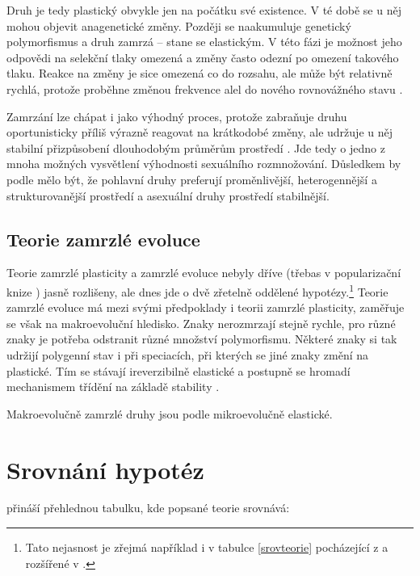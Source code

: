 Druh je tedy plastický obvykle jen na počátku své existence. V té době se u něj mohou objevit anagenetické změny.
Později se naakumuluje genetický polymorfismus a druh zamrzá -- stane se elastickým. V této fázi je možnost jeho
odpovědi na selekční tlaky omezená a změny často odezní po omezení takového tlaku. Reakce na změny je sice omezená
co do rozsahu, ale může být relativně rychlá, protože proběhne změnou frekvence alel do nového rovnovážného stavu
\citep[str. 194]{flegr2016}.

Zamrzání lze chápat i jako výhodný proces, protože zabraňuje druhu oportunisticky příliš výrazně reagovat na
krátkodobé změny, ale udržuje u něj stabilní přizpůsobení dlouhodobým průměrům prostředí \citep[str. 195]{flegr2016}.
Jde tedy o jedno z mnoha možných vysvětlení výhodnosti sexuálního rozmnožování. Důsledkem by podle
\citet[str. 166--167]{toman2015} mělo být, že pohlavní druhy preferují proměnlivější, heterogennější
a strukturovanější prostředí a asexuální druhy prostředí stabilnější.

\subsection{Teorie zamrzlé evoluce}

Teorie zamrzlé plasticity a zamrzlé evoluce nebyly dříve (třebas v popularizační knize \citet{flegr2006})
jasně rozlišeny, ale dnes   jde o dvě zřetelně oddělené hypotézy.\footnote{
Tato nejasnost je zřejmá například i v tabulce \ref{srovteorie} pocházející z \citet{flegr2010} a rozšířené v
\citet{flegr2013}.
}
Teorie zamrzlé evoluce má mezi svými předpoklady i teorii zamrzlé plasticity, zaměřuje se však na makroevoluční
hledisko. Znaky nerozmrzají stejně rychle, pro různé znaky je potřeba odstranit různé množství polymorfismu.
Některé znaky si tak udržijí polygenní stav i při speciacích, při kterých se jiné znaky změní na plastické.
Tím se stávají ireverzibilně elastické a postupně se hromadí mechanismem třídění
na základě stability \citep[str. 294--296]{flegr2016}.

Makroevolučně zamrzlé druhy jsou podle \citet[str. 2]{flegr2013} mikroevolučně elastické.

\section{Srovnání hypotéz}

\citet{flegr2013} přináší přehlednou tabulku, kde popsané teorie srovnává:

\footnotesize

